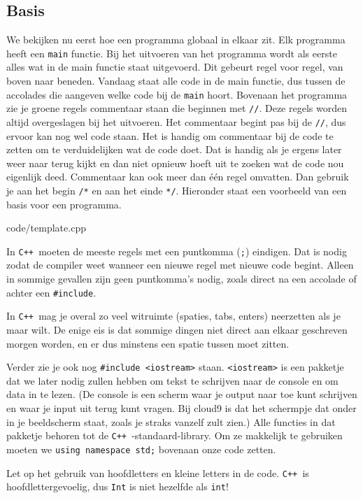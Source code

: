 \documentclass[12pt,a4paper]{article}
\newcommand{\code}{}
\newcommand{\icode}{\lstinline}
\newcommand{\mono}{\texttt}
\newcommand{\cpp}{\mono{C++ }}
\begin{document}
\subsection{Basis}
We bekijken nu eerst hoe een programma globaal in elkaar zit.  Elk programma heeft een \icode{main} functie. Bij het uitvoeren van het programma wordt als eerste alles wat in de main functie staat uitgevoerd. Dit gebeurt regel voor regel, van boven naar beneden. Vandaag staat alle code in de main functie, dus tussen de accolades die aangeven welke code bij de \icode{main} hoort.
Bovenaan het programma zie je groene regels commentaar staan die beginnen met \icode{//}. Deze regels worden altijd overgeslagen bij het uitvoeren. Het commentaar begint pas bij de \icode{//}, dus ervoor kan nog wel code staan. Het is handig om commentaar bij de code te zetten om te verduidelijken wat de code doet. Dat is handig als je ergens later weer naar terug kijkt en dan niet opnieuw hoeft uit te zoeken wat de code nou eigenlijk deed. Commentaar kan ook meer dan \'e\'en regel omvatten. Dan gebruik je aan het begin \icode{/*} en aan het einde \icode{*/}. Hieronder staat een voorbeeld van een basis voor een programma. 

\code{code/template.cpp}

In \cpp moeten de meeste regels met een puntkomma (\icode{;}) eindigen. Dat is nodig zodat de compiler weet wanneer een nieuwe regel met nieuwe code begint. Alleen in sommige gevallen zijn geen puntkomma's nodig, zoals direct na een accolade of achter een \icode{#include}.

In \cpp  mag je overal zo veel witruimte (spaties, tabs, enters) neerzetten als je maar wilt. De enige eis is dat sommige dingen niet direct aan elkaar geschreven morgen worden, en er dus minstens een spatie tussen moet zitten.


Verder zie je ook nog \icode{#include <iostream>} staan. \icode{<iostream>} is een pakketje dat we later nodig zullen hebben om tekst te schrijven naar de console en om data in te lezen.
(De console is een scherm waar je output naar toe kunt schrijven en waar je input uit terug kunt vragen. Bij cloud9 is dat het schermpje dat onder in je beeldscherm staat, zoals je straks vanzelf zult zien.)
Alle functies in dat pakketje behoren tot de \cpp-standaard-library. Om ze makkelijk te gebruiken moeten we \icode{using namespace std;} bovenaan onze code zetten.

Let op het gebruik van hoofdletters en kleine letters in de code. \cpp is hoofdlettergevoelig, dus \icode{Int} is niet hezelfde als \icode{int}!
\end{document}
